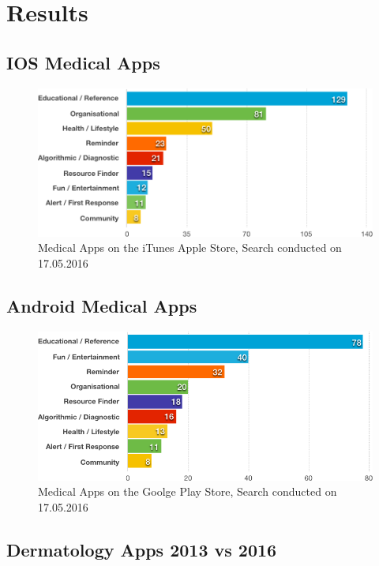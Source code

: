 \section{Results}


\subsection{IOS Medical Apps}

\begin{figure}[H]
    \centering
    \includegraphics[width=\textwidth]{assets/market_research/apple_chart1.png}
    \caption{Medical Apps on the iTunes Apple Store, Search conducted on 17.05.2016}
    \label{fig:itunes_apps}
\end{figure}


\subsection{Android Medical Apps}

\begin{figure}[H]
    \centering
    \includegraphics[width=\textwidth]{assets/market_research/android_chart.png}
    \caption{Medical Apps on the Goolge Play Store, Search conducted on 17.05.2016}
    \label{fig:android_apps}
\end{figure}

\subsection{Dermatology Apps 2013 vs 2016}

